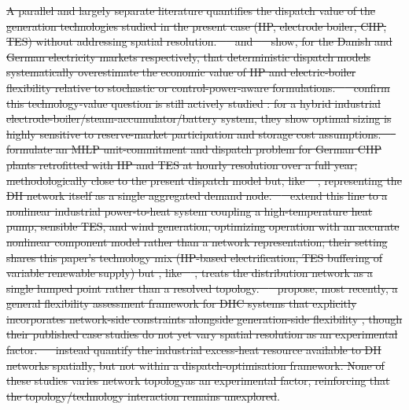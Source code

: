 \documentclass[a4paper,fleqn]{cas-sc} %
\providecommand{\citet}[1]{\cite{#1}} %
\providecommand{\DIFdel}[1]{{\protect\color{red}\sout{#1}}} %
\providecommand{\DIFdelbegin}{} %
\providecommand{\DIFdelend}{} %
\begin{document}
{{%
\DIFdel{A parallel and largely separate literature quantifies the dispatch
value of the generation technologies studied in the present case
(HP, electrode boiler, CHP, TES) without addressing spatial
resolution. \mbox{%
\citet{Nielsen2016} }\hskip0pt%
and \mbox{%
\citet{Boettger2015} }\hskip0pt%
show, for
the Danish and German electricity markets respectively, that
deterministic dispatch models systematically overestimate the economic value of HP and electric-boiler flexibility relative to
stochastic or control-power-aware formulations. \mbox{%
\citet{Galteland2026} }\hskip0pt%
confirm this technology-value
question is still actively studied : for a hybrid industrial
electrode-boiler/steam-accumulator/battery system, they show optimal
sizing is highly sensitive to reserve-market participation and
storage cost assumptions. \mbox{%
\citet{Mollenhauer2018} }\hskip0pt%
formulate an MILP
unit-commitment and dispatch problem for German CHP plants
retrofitted with HP and TES at hourly resolution over a full year,
methodologically close to the present dispatch model but, like
\mbox{%
\citet{Schweiger2017_p2h,Averfalk2017,David2017}}\hskip0pt%
, representing the DH network itself as a single aggregated demand
node. \mbox{%
\citet{Walden2023} }\hskip0pt%
extend this line to a nonlinear industrial
power-to-heat system coupling a high-temperature heat pump, sensible
TES, and wind generation, optimizing operation with an accurate
nonlinear component model rather than a network representation; their setting shares this paper's technology mix (HP-based
electrification, TES buffering of variable renewable supply) but ,
like \mbox{%
\citet{Mollenhauer2018}}\hskip0pt%
, treats the distribution network as a single lumped point rather than a resolved topology.
\mbox{%
\citet{Riedl2026} }\hskip0pt%
propose, most recently, a general flexibility
assessment framework for DHC systems that explicitly incorporates
network-side constraints alongside generation-side flexibility ,
though their published
case studies do not yet vary spatial resolution as an experimental
factor. \mbox{%
\citet{Buhler2017} }\hskip0pt%
instead quantify the industrial excess-heat
resource available to DH networks spatially, but not within a
dispatch-optimisation  framework. None of these studies varies
network topologyas an experimental factor, reinforcing that the
topology/technology interaction remains unexplored}\DIFdelend . \DIFdelbegin %

}}
\end{document}
